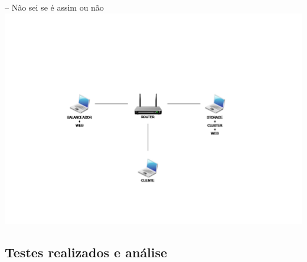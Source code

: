 -- Não sei se é assim ou não
\includegraphics[scale=.4]{img/AmbienteDeTestes}

\subsection{Testes realizados e análise}

